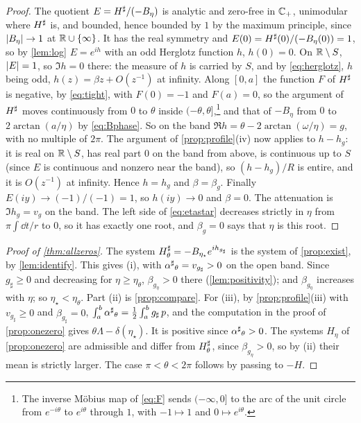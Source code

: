 \begin{proof}
The quotient $E=H^{\sharp}/(-B_\eta)$ is analytic and zero-free in $\mathbb C_{+}$, unimodular
where $H^{\sharp}$ is, and bounded, hence bounded by $1$ by the maximum principle, since
$\left|B_\eta\right|\to1$ at $\mathbb R\cup\{\infty\}$. It has the real symmetry and
$E(0)=H^{\sharp}(0)/(-B_\eta(0))=1$, so by \cref{lem:log} $E=e^{ih}$ with an odd
Herglotz function $h$, $h(0)=0$. On $\mathbb R\setminus S$, $\left|E\right|=1$, so $\Im h=0$ there:
the measure of $h$ is carried by $S$, and by \eqref{eq:herglotz}, $h$ being
odd, $h(z)=\beta z+O(z^{-1})$ at infinity. Along $[0,a]$ the function $F$ of
$H^{\sharp}$ is negative, by \eqref{eq:tight}, with $F(0)=-1$ and $F(a)=0$, so the
argument of $H^{\sharp}$ moves continuously from $0$ to $\theta$ inside
$(-\theta,\theta]$,\footnote{The inverse M\"obius map of \eqref{eq:F} sends
$(-\infty,0]$ to the arc of the unit circle from $e^{-i\theta}$ to $e^{i\theta}$
through $1$, with $-1\mapsto1$ and $0\mapsto e^{i\theta}$.} and that of $-B_\eta$ from $0$ to $2\arctan(a/\eta)$ by
\eqref{eq:Bphase}. So on the band $\Re h=\theta-2\arctan(\omega/\eta)=g$, with
no multiple of $2\pi$. The argument of \cref{prop:profile}(iv) now applies
to $h-h_g$: it is real on $\mathbb R\setminus S$, has real part $0$ on the band from
above, is continuous up to $S$ (since $E$ is continuous and nonzero near the
band), so $(h-h_g)/R$ is entire, and it is
$O(z^{-1})$ at infinity. Hence $h=h_g$ and $\beta=\beta_g$. Finally
$E(iy)\to(-1)/(-1)=1$, so $h(iy)\to0$ and $\beta=0$. The attenuation is
$\Im h_g=v_g$ on the band. The left side of \eqref{eq:etastar} decreases
strictly in $\eta$ from $\pi\int\dd t/r$ to $0$, so it has exactly one root,
and $\beta_g=0$ says that $\eta$ is this root.
\end{proof}

\begin{proof}[Proof of \cref{thm:allzeros}]
The system $H^{\sharp}_\theta=-B_{\eta_\star}e^{ih_{g_\sharp}}$ is the system of
\cref{prop:exist}, by \cref{lem:identify}. This gives (i), with ${\alpha^{\sharp}}_\theta=v_{g_\sharp}>0$ on the
open band. Since $g_\sharp\ge0$ and decreasing for $\eta\ge\eta_\theta$,
$\beta_{g_\eta}>0$ there (\cref{lem:positivity}); and $\beta_{g_\eta}$ increases
with $\eta$; so $\eta_\star<\eta_\theta$. Part (ii) is \cref{prop:compare}. For
(iii), by \cref{prop:profile}(iii) with $v_{g_\sharp}\ge0$ and $\beta_{g_\sharp}=0$,
$\int_a^b{\alpha^{\sharp}}_\theta=\frac12\int_a^bg_\sharp\,p$, and the computation in the proof of
\cref{prop:onezero} gives $\theta\Lambda-\delta(\eta_\star)$. It is positive since
${\alpha^{\sharp}}_\theta>0$. The systems $H_\eta$ of \cref{prop:onezero} are admissible and
differ from $H^{\sharp}_\theta$, since $\beta_{g_\eta}>0$, so by (ii) their mean is
strictly larger. The case $\pi<\theta<2\pi$ follows by passing to $-H$.
\end{proof}

